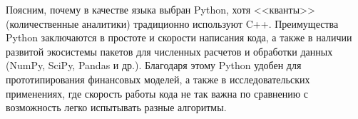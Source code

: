 \begin{remark*}
Поясним, почему в качестве языка выбран Python, хотя <<кванты>> (количественные аналитики) традиционно используют C++.
Преимущества Python заключаются в простоте и скорости написания кода, а также в наличии развитой экосистемы пакетов для численных расчетов и обработки данных (NumPy, SciPy, Pandas и др.).
Благодаря этому Python удобен для прототипирования финансовых моделей, а также в исследовательских применениях, где скорость работы кода не так важна по сравнению с возможность легко испытывать разные алгоритмы. 
\end{remark*}

